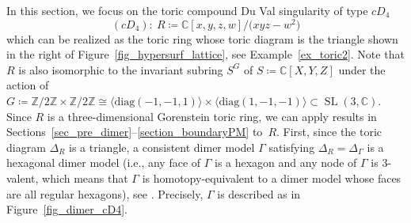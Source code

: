 \documentclass[pdftex]{sigma}
\numberwithin{equation}{section}
\theoremstyle{definition}
\newcommand{\ZZ}{\mathbb{Z}}
\newcommand{\CC}{\mathbb{C}}
\newcommand{\SL}{\operatorname{SL}}
\begin{document}
In this section, we focus on the toric compound Du Val singularity of type $cD_4$
\[
(cD_4)\colon \ R\coloneqq \CC[x,y,z,w]/\bigl(xyz-w^2\bigr)
\]
which can be realized as the toric ring
whose toric diagram is the triangle shown in the right of Figure~\ref{fig_hypersurf_lattice}, see Example~\ref{ex_toric2}.
Note that $R$ is also isomorphic to the invariant subring $S^G$ of $S\coloneqq \CC[X, Y, Z]$ under the action of
$G\coloneqq \ZZ/2\ZZ\times \ZZ/2\ZZ\cong \langle\mathrm{diag}(-1,-1,1)\rangle\times\langle\mathrm{diag}(1,-1,-1)\rangle\subset\SL(3,\CC)$.
Since $R$ is a three-dimensional Gorenstein toric ring, we can apply results in Sections~\mbox{\ref{sec_pre_dimer}--\ref{section_boundaryPM}} to~$R$.
First, since the toric diagram $\Delta_R$ is a triangle, a consistent dimer model $\Gamma$ satisfying $\Delta_R=\Delta_\Gamma$
is a hexagonal dimer model (i.e., any face of $\Gamma$ is a hexagon and any node of $\Gamma$ is 3\nobreakdash-valent,
which means that $\Gamma$ is homotopy-equivalent to a dimer model whose faces are all regular hexagons), see \cite{IN_steady,UY_McKay}.
Precisely, $\Gamma$ is described as in Figure~\ref{fig_dimer_cD4}.
\end{document}

